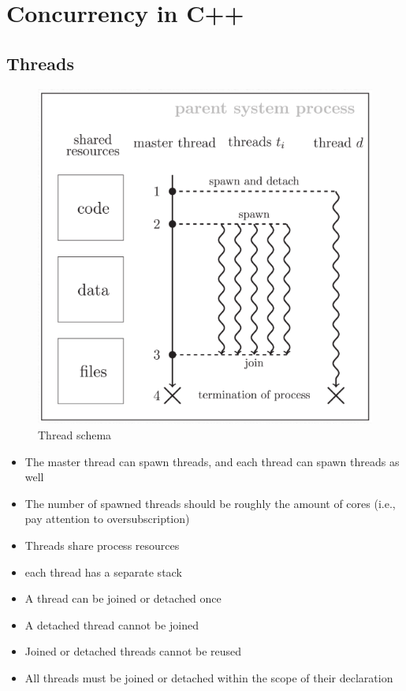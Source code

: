 \chapter{Concurrency in C++}

\section{Threads}

\begin{paracol}{2}
   \begin{figure}[htbp]
      \centering
      \includegraphics{images/08/threads1.png}
      \caption{Thread schema}
      \label{fig:08/threads1}
   
   \end{figure}
   
   \switchcolumn
   
   \begin{itemize}
      \item The master thread can spawn threads, and each thread can
   spawn threads as well
      \item The number of spawned threads should be roughly the
   amount of cores (i.e., pay attention to oversubscription)
      \item Threads share process resources
      \item each thread has a separate stack
      \item A thread can be joined or detached once
      \item A detached thread cannot be joined
      \item Joined or detached threads cannot be reused
      \item All threads must be joined or detached within the scope of
   their declaration
   \end{itemize}
\end{paracol}

